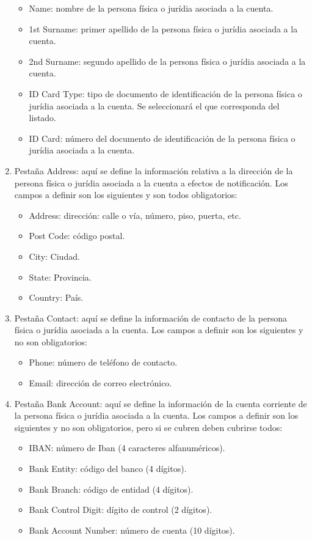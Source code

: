 \begin{enumerate}
	\begin{itemize}
	\item Name: nombre de la persona física o jurídia asociada a la cuenta.
	\item 1st Surname: primer apellido de la persona física o jurídia asociada a la cuenta.
	\item 2nd Surname: segundo apellido de la persona física o jurídia asociada a la cuenta.
	\item ID Card Type: tipo de documento de identificación de la persona física o jurídia asociada a la cuenta. Se seleccionará el que corresponda del listado.
	\item ID Card: número del documento de identificación de la persona física o jurídia asociada a la cuenta.
	\end{itemize}
\item Pestaña Address: aquí se define la información relativa a la dirección de la persona física o jurídia asociada a la cuenta a efectos de notificación. Los campos a definir son los siguientes y son todos obligatorios:
	\begin{itemize}
	\item Address: dirección: calle o vía, número, piso, puerta, etc.
	\item Post Code: código postal.
	\item City: Ciudad.
	\item State: Provincia.
	\item Country: País.
	\end{itemize}
\item Pestaña Contact: aquí se define la información de contacto de la persona física o jurídia asociada a la cuenta. Los campos a definir son los siguientes y no son obligatorios:
	\begin{itemize}
	\item Phone: número de teléfono de contacto.
	\item Email: dirección de correo electrónico.
	\end{itemize}
\item Pestaña Bank Account: aquí se define la información de la cuenta corriente de la persona física o jurídia asociada a la cuenta. Los campos a definir son los siguientes y no son obligatorios, pero si se cubren deben cubrirse todos:
	\begin{itemize}
	\item IBAN: número de Iban (4 caracteres alfanuméricos).
	\item Bank Entity: código del banco (4 dígitos).
	\item Bank Branch: código de entidad (4 dígitos).
	\item Bank Control Digit: dígito de control (2 dígitos).
	\item Bank Account Number: número de cuenta (10 dígitos).	
	\end{itemize}	
\end{enumerate}


